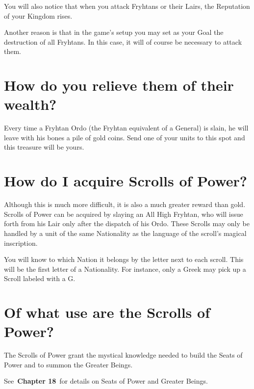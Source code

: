 You will also notice that when you attack Fryhtans or their Lairs, the Reputation of your Kingdom rises.

Another reason is that in the game’s setup you may set as your Goal the destruction of all Fryhtans. In this case, it will of course be necessary to attack them.

\section{How do you relieve them of their wealth?}

Every time a Fryhtan Ordo (the Fryhtan equivalent of a General) is slain, he will leave with his bones a pile of gold coins. Send one of your units to this spot and this treasure will be yours.

\section{How do I acquire Scrolls of Power?}

Although this is much more difficult, it is also a much greater reward than gold. Scrolls of Power can be acquired by slaying an All High Fryhtan, who will issue forth from his Lair only after the dispatch of his Ordo. These Scrolls may only be handled by a unit of the same Nationality as the language of the scroll’s magical inscription.

You will know to which Nation it belongs by the letter next to each scroll. This will be the first letter of a Nationality. For instance, only a Greek may pick up a Scroll labeled with a G.

\section{Of what use are the Scrolls of Power?}

The Scrolls of Power grant the mystical knowledge needed to build the Seats of Power and to summon the Greater Beings.

See \textbf{Chapter 18} for details on Seats of Power and Greater Beings.